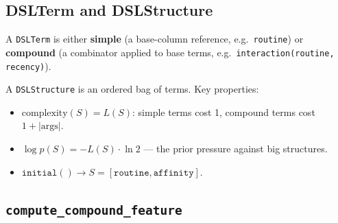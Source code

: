 \documentclass[11pt,a4paper]{article}
\begin{document}
\subsection{DSLTerm and DSLStructure}

A \texttt{DSLTerm} is either \textbf{simple} (a base-column reference, e.g.\ \texttt{routine}) or \textbf{compound} (a combinator applied to base terms, e.g.\ \texttt{interaction(routine, recency)}).

A \texttt{DSLStructure} is an ordered bag of terms. Key properties:
\begin{itemize}
\item $\text{complexity}(S) = L(S)$: simple terms cost 1, compound terms cost $1 + |\text{args}|$.
\item $\log p(S) = -L(S) \cdot \ln 2$ --- the prior pressure against big structures.
\item $\texttt{initial}() \to S = [\texttt{routine}, \texttt{affinity}]$.
\end{itemize}

\subsection{\texttt{compute\_compound\_feature}}
\end{document}
